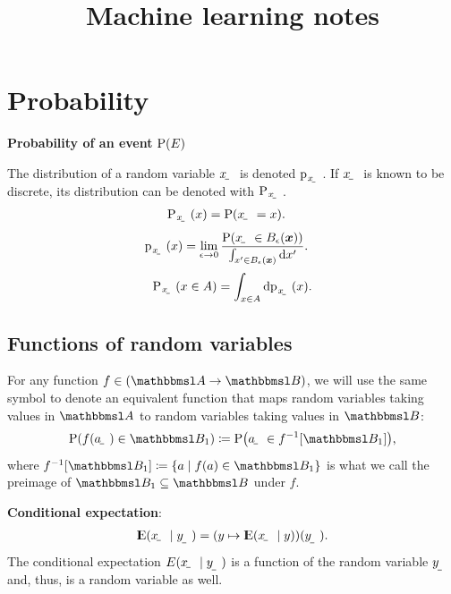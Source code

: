 \documentclass[twocolumn]{article}
\title{Machine learning notes}
\author{}
\date{}
\begin{document}
\maketitle

\tableofcontents

\newpage

\begingroup
\onehalfspacing
\printunsrtglossary[type=symbols,style=supergroup,title={Notation}]
\endgroup




\section{Probability}


\textbf{Probability of an event} $\P(E)$

The distribution of a random variable $\rvar x$ is denoted $\p_\rvar{x}$. If $\rvar x$ is known to be discrete, its distribution can be denoted with $\P_\rvar{x}$. 
\begin{align}
    \P_\rvar{x}(x) &= \P(\rvar x = x) \text.
\end{align}
\begin{align}
    \p_\rvar{x}(x) &= \lim_{\epsilon\to0}\frac{\P\del{\rvar x\in B_\epsilon(\vec x)}}{\int_{x'\in B_\epsilon(\vec x)}\dif x'} \text.
\end{align}
\begin{align}
    \P_\rvar{x}(x\in A) = \int_{x\in A}\dif \p_\rvar{x}(x) \text.
\end{align}

\subsection{Functions of random variables}

For any function $f\in(\set A\to\set B)$, we will use the same symbol to denote an equivalent function that maps random variables taking values in $\set A$ to random variables taking values in $\set B$:
\begin{align}
    \P(f(\rvar a)\in \set B_1) \coloneqq \P\del{\rvar a\in f^{-1}\sbr{\set B_1}} \text,
\end{align}
where $f^{-1}\sbr{\set B_1} \coloneqq \cbr{a\mid f(a)\in \set B_1}$ is what we call the preimage of $\set B_1\subseteq\set B$ under $f$.

\textbf{Conditional expectation}:
\begin{align}
    \E\del{\rvar x\mid\rvar y} = \del{y\mapsto \E\del{\rvar x\mid y}}(\rvar{y}) \text.
\end{align}
The conditional expectation $E\del{\rvar x\mid\rvar y}$ is a function of the random variable $\rvar y$ and, thus, is a random variable as well. 
\end{document}
